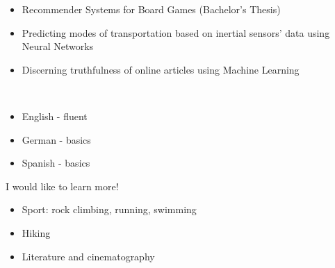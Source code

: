 \vspace{3mm}
\begin{itemize}
    \item{\textcolor{emphasis}{Recommender Systems for Board Games}  (Bachelor's Thesis)}
    \item{\textcolor{emphasis}{Predicting modes of transportation based on inertial sensors' data using Neural Networks}}
    \item{\textcolor{emphasis}{Discerning truthfulness of online articles using Machine Learning}}
\end{itemize}

 \vspace{3mm}
 \\

\vspace{4mm}
\begin{itemize}
\item{\textcolor{emphasis}{English} - fluent}

\item{\textcolor{emphasis}{German} - basics}

\item{\textcolor{emphasis}{Spanish} - basics}
\end{itemize}
\medskip
I would like to learn more!

\vspace{4mm}
\begin{itemize}
\item Sport: rock climbing, running, swimming
\item Hiking
\item Literature and cinematography
\end{itemize}

\medskip
